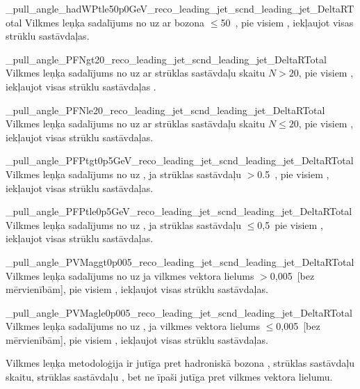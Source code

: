           {_pull_angle_hadWPtle50p0GeV_reco_leading_jet_scnd_leading_jet_DeltaRTotal}
          {Vilkmes leņķa sadalījums no \leadingjet uz \scndleadingjet ar \PW bozona \pt$\leq$50~\GeV, pie visiem \DeltaR, iekļaujot visas strūklu sastāvdaļas.}
          

          {_pull_angle_PFNgt20_reco_leading_jet_scnd_leading_jet_DeltaRTotal}
          {Vilkmes leņķa sadalījums no \leadingjet uz \scndleadingjet ar strūklas sastāvdaļu skaitu $N>20$, pie visiem \DeltaR, iekļaujot visas strūklu sastāvdaļas .}

          {_pull_angle_PFNle20_reco_leading_jet_scnd_leading_jet_DeltaRTotal}
          {Vilkmes leņķa sadalījums no \leadingjet uz \scndleadingjet ar strūklas sastāvdaļu skaitu $N\leq20$, pie visiem \DeltaR, iekļaujot visas strūklu sastāvdaļas.}

          {_pull_angle_PFPtgt0p5GeV_reco_leading_jet_scnd_leading_jet_DeltaRTotal}
          {Vilkmes leņķa sadalījums no \leadingjet uz \scndleadingjet, ja strūklas sastāvdaļu \pt$>$0.5~\GeV, pie visiem \DeltaR, iekļaujot visas strūklu sastāvdaļas.}

          {_pull_angle_PFPtle0p5GeV_reco_leading_jet_scnd_leading_jet_DeltaRTotal}
          {Vilkmes leņķa sadalījums  no \leadingjet uz \scndleadingjet, ja strūklas sastāvdaļu \pt$\leq$0,5~\GeV pie visiem \DeltaR, iekļaujot visas strūklu sastāvdaļas.}

          {_pull_angle_PVMaggt0p005_reco_leading_jet_scnd_leading_jet_DeltaRTotal}
          {Vilkmes leņķa sadalījums no \leadingjet uz \scndleadingjet ja vilkmes vektora lielums $>$0,005~[bez mērvienībām], pie visiem \DeltaR, iekļaujot visas strūklu sastāvdaļas.}

          {_pull_angle_PVMagle0p005_reco_leading_jet_scnd_leading_jet_DeltaRTotal}
          {Vilkmes leņķa sadalījums  no \leadingjet uz \scndleadingjet, ja vilkmes vektora lielums $\leq$0,005~[bez mērvienībām], pie visiem \DeltaR, iekļaujot visas strūklu sastāvdaļas.}

Vilkmes leņķa metodoloģija ir jutīga pret hadroniskā \PW bozona \pt, strūklas sastāvdaļu skaitu, strūklas sastāvdaļu \pt, bet ne īpaši jutīga pret vilkmes vektora lielumu. 

